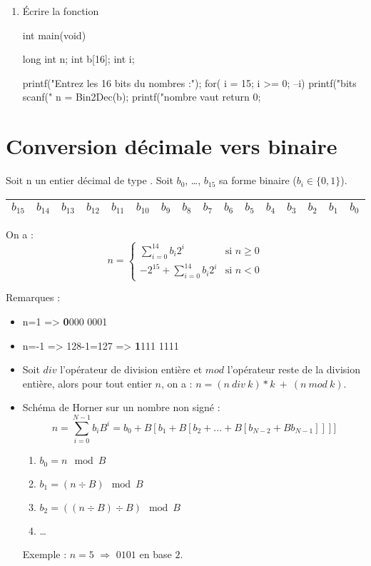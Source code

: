 \begin{enumerate}
\begin{csourcecorrection}
{  n = Base2Dec(2,15,b);
  if (b[15] == 1)
    n = (-1L<<15) + n;
  return n;
}
\end{csourcecorrection}
  \item Écrire la fonction 
\begin{csourcecorrection}
int main(void)
{
  long int n;
  int b[16];
  int i;

  printf("Entrez les 16 bits du nombres :\n");
  for( i = 15; i >= 0; --i)
  {
    printf("bits %
    scanf("%
  }
  n = Bin2Dec(b);
  printf("\nLe nombre vaut %
  return 0;
}
\end{csourcecorrection}
\end{enumerate}


\section{Conversion décimale vers binaire}

Soit n un entier décimal de type . Soit $b_0$, \ldots, $b_{15}$ sa forme binaire ($b_i\in\{0,1\}$).
\begin{center}
\begin{tabular}{|c|c|c|c|c|c|c|c|c|c|c|c|c|c|c|c|}
\hline
$b_{15}$&$b_{14}$&$b_{13}$&$b_{12}$&$b_{11}$&$b_{10}$&$b_9$&$b_8$&$b_7$&$b_6$&$b_5$&$b_4$&$b_3$&$b_2$&$b_1$&$b_0$\\
\hline
\end{tabular}
\end{center}

On a :
$$n=\begin{cases}
    \sum_{i=0}^{14}b_i2^i&\text{si }n\geq0\\
    -2^{15}+\sum_{i=0}^{14}b_i2^i&\text{si }n<0
    \end{cases}$$

Remarques :
\begin{itemize}
  \item n=1 => \textbf{0}000 0001
  \item n=-1 => 128-1=127 => \textbf{1}111 1111
  \item Soit $div$ l'opérateur de division entière et $mod$ l'opérateur reste de la division entière, alors pour tout entier $n$, on a : $n = (n\ div\ k)*k\ +\ (n\ mod\ k)$.
  \item Schéma de Horner sur un nombre non signé : $$n=\sum\limits_{i=0}^{N-1}b_iB^i=b_0+B[b_1+B[b_2+\ldots+B[b_{N-2}+Bb_{N-1}]]]]$$
    \begin{enumerate}
          \item $b_0=n\mod B$
          \item $b_1=(n\div B) \mod B$
          \item $b_2=((n\div B) \div B) \mod B$
          \item \ldots
      \end{enumerate}
    Exemple : $n=5$ $\Longrightarrow$ $0101$ en base $2$.
\end{itemize}

